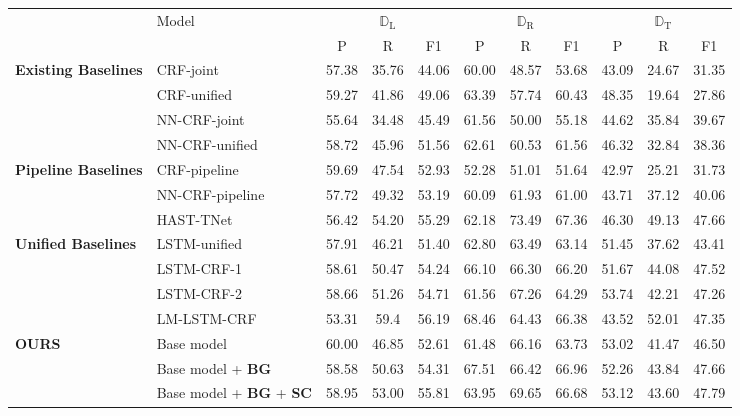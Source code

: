 \documentclass[letterpaper]{article}
\begin{document}
\begin{table}[]
    \centering
    \begin{tabular}{ll|ccc|ccc|ccc}
    \Xhline{3\arrayrulewidth}
        & \multirow{2}{*}{Model} & \multicolumn{3}{c|}{$\mathbb{D}_{\text{L}}$} & \multicolumn{3}{c|}{$\mathbb{D}_{\text{R}}$} & \multicolumn{3}{c}{$\mathbb{D}_{\text{T}}$}\\ \cline{3-11}
        & & P & R & F1 & P & R & F1 & P & R & F1 \\ \hline \hline
        \multirow{4}{*}{\textbf{Existing Baselines}} & CRF-joint & 57.38 & 35.76 & 44.06 & 60.00 & 48.57 & 53.68 & 43.09 & 24.67 & 31.35 \\
        & CRF-unified & 59.27 & 41.86 & 49.06 & 63.39 & 57.74 & 60.43 & 48.35 & 19.64 & 27.86 \\
        & NN-CRF-joint & 55.64 & 34.48 & 45.49 & 61.56 & 50.00 & 55.18 & 44.62 & 35.84 & 39.67 \\
        & NN-CRF-unified & 58.72 & 45.96 & 51.56 & 62.61 & 60.53 & 61.56 & 46.32 & 32.84 & 38.36 \\ \hline
        \multirow{3}{*}{\textbf{Pipeline Baselines}} & CRF-pipeline & 59.69 & 47.54 & 52.93 & 52.28 & 51.01 & 51.64 & 42.97 & 25.21 & 31.73 \\
        & NN-CRF-pipeline & 57.72 & 49.32 & 53.19 & 60.09 & 61.93 & 61.00 & 43.71 & 37.12 & 40.06 \\
        & HAST-TNet & 56.42 & 54.20 & 55.29 & 62.18 & 73.49 & 67.36 & 46.30 & 49.13 & 47.66 \\ \hline
        \multirow{4}{*}{\textbf{Unified Baselines}} & LSTM-unified & 57.91 & 46.21 & 51.40 & 62.80 & 63.49 & 63.14 & 51.45 & 37.62 & 43.41 \\
        &LSTM-CRF-1 & 58.61 & 50.47 & 54.24 & 66.10 & 66.30 & 66.20 & 51.67 & 44.08 & 47.52 \\
        & LSTM-CRF-2 & 58.66 & 51.26 & 54.71 & 61.56 & 67.26 & 64.29 & 53.74 & 42.21 & 47.26 \\
        & LM-LSTM-CRF & 53.31 & 59.4 & 56.19 & 68.46 & 64.43 & 66.38 & 43.52 & 52.01 & 47.35 \\ \hline
        \multirow{5}{*}{\textbf{OURS}}
        & Base model & 60.00 & 46.85 & 52.61 & 61.48 & 66.16 & 63.73 & 53.02 & 41.47 & 46.50 \\
        & Base model + \textbf{BG} & 58.58 & 50.63 & 54.31 & 67.51 & 66.42 & 66.96 & 52.26 & 43.84 & 47.66 \\
        & Base model + \textbf{BG} + \textbf{SC} & 58.95 & 53.00 & 55.81 & 63.95 & 69.65 & 66.68 & 53.12 & 43.60 & 47.79 \\

\end{tabular}
\end{table}
\end{document}
